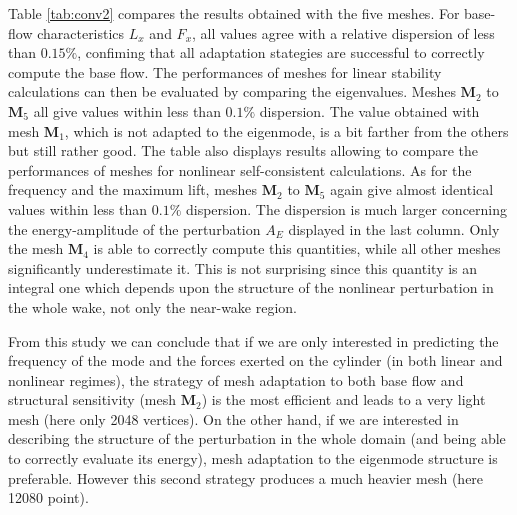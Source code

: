 \documentclass[twocolumn,10pt]{asme2ej}
\begin{document}
Table  \ref{tab:conv2} compares the results obtained with the five meshes. For base-flow characteristics $L_x$ and $F_x$, all values agree with a relative dispersion of less than $0.15\%$, confiming that all adaptation stategies are successful to correctly compute the base flow. 
The performances of meshes for linear stability calculations can then be evaluated by comparing the eigenvalues. Meshes $\mathbf{M}_2$ to $\mathbf{M}_5$ all give values within less than $0.1\%$ dispersion. The value obtained with mesh  $\mathbf{M}_1$, which is not adapted to the eigenmode, is a bit farther from the others but still rather good. The table also displays results allowing to compare the performances of meshes for nonlinear self-consistent calculations. As for the frequency and the maximum lift, meshes $\mathbf{M}_2$ to $\mathbf{M}_5$ again give almost identical values within less than $0.1\%$ dispersion. The dispersion is much larger concerning the energy-amplitude of the perturbation $A_E$ displayed in the last column. Only the mesh $\mathbf{M}_4$ is able to correctly compute this quantities, while all other meshes significantly underestimate it. This is not surprising since this quantity is an integral one which depends upon the structure of the nonlinear perturbation in the whole wake, not only the near-wake region.

From this study we can conclude that if we are only interested in predicting the frequency of the mode and the forces exerted on the cylinder (in both linear and nonlinear regimes), the strategy of mesh adaptation to both base flow and structural sensitivity (mesh $\mathbf{M}_2$) is the most efficient and leads to a very light mesh (here only 2048 vertices). On the other hand, if we are interested in describing the structure of the perturbation in the whole domain (and being able to correctly evaluate its energy), mesh adaptation to the eigenmode structure is preferable. However this second strategy produces a much heavier mesh (here 12080 point).
 
\end{document}
